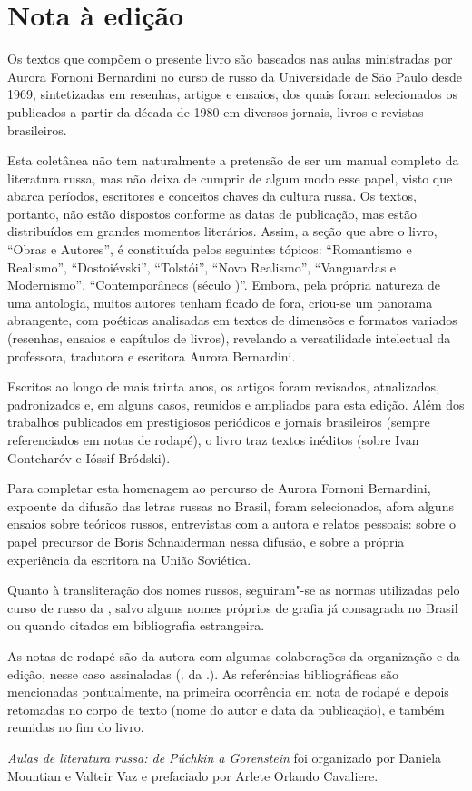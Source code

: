 \chapter{Nota à edição}

Os textos que compõem o presente livro são baseados nas aulas
ministradas por Aurora Fornoni Bernardini no curso de russo da
Universidade de São Paulo desde 1969, sintetizadas em resenhas, artigos
e ensaios, dos quais foram selecionados os publicados a partir da década
de 1980 em diversos jornais, livros e revistas brasileiros.

Esta coletânea não tem naturalmente a pretensão de ser um manual
completo da literatura russa, mas não deixa de cumprir de algum modo
esse papel, visto que abarca períodos, escritores e conceitos chaves da
cultura russa. Os textos, portanto, não estão dispostos conforme as
datas de publicação, mas estão distribuídos em grandes momentos
literários. Assim, a seção que abre o livro, ``Obras e Autores'', é
constituída pelos seguintes tópicos: ``Romantismo e Realismo'',
``Dostoiévski'', ``Tolstói'', ``Novo Realismo'', ``Vanguardas e
Modernismo'', ``Contemporâneos (século )''. Embora, pela própria
natureza de uma antologia, muitos autores tenham ficado de fora,
criou-se um panorama abrangente, com poéticas analisadas em textos de
dimensões e formatos variados (resenhas, ensaios e capítulos de livros),
revelando a versatilidade intelectual da professora, tradutora e
escritora Aurora Bernardini.

Escritos ao longo de mais trinta anos, os artigos foram revisados,
atualizados, padronizados e, em alguns casos, reunidos e ampliados para
esta edição. Além dos trabalhos publicados em prestigiosos periódicos e
jornais brasileiros (sempre referenciados em notas de rodapé), o livro
traz textos inéditos (sobre Ivan Gontcharóv e Ióssif Bródski).

Para completar esta homenagem ao percurso de Aurora Fornoni Bernardini,
expoente da difusão das letras russas no Brasil, foram selecionados,
afora alguns ensaios sobre teóricos russos, entrevistas com a autora e
relatos pessoais: sobre o papel precursor de Boris Schnaiderman nessa
difusão, e sobre a própria experiência da escritora na União Soviética.

Quanto à transliteração dos nomes russos, seguiram"-se as normas
utilizadas pelo curso de russo da , salvo alguns nomes próprios de
grafia já consagrada no Brasil ou quando citados em bibliografia
estrangeira.

As notas de rodapé são da autora com algumas colaborações da organização
e da edição, nesse caso assinaladas (. da .). As referências
bibliográficas são mencionadas pontualmente, na primeira ocorrência em
nota de rodapé e depois retomadas no corpo de texto (nome do autor e
data da publicação), e também reunidas no fim do livro.

\emph{Aulas de literatura russa: de Púchkin a Gorenstein} foi
organizado por Daniela Mountian e Valteir Vaz e prefaciado por Arlete
Orlando Cavaliere.
